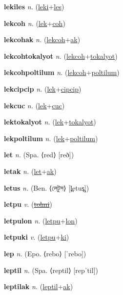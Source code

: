 \textbf{\hypertarget{lekiles}{lekiles}} \textit{n.} (\hyperlink{leki}{leki}+\allowbreak \hyperlink{les}{les})


\textbf{\hypertarget{lekcoh}{lekcoh}} \textit{n.} (\hyperlink{lek}{lek}+\allowbreak \hyperlink{coh}{coh})


\textbf{\hypertarget{lekcohak}{lekcohak}} \textit{n.} (\hyperlink{lekcoh}{lekcoh}+\allowbreak \hyperlink{ak}{ak})


\textbf{\hypertarget{lekcohtokalyot}{lekcohtokalyot}} \textit{n.} (\hyperlink{lekcoh}{lekcoh}+\allowbreak \hyperlink{tokalyot}{tokalyot})


\textbf{\hypertarget{lekcohpoltilum}{lekcohpoltilum}} \textit{n.} (\hyperlink{lekcoh}{lekcoh}+\allowbreak \hyperlink{poltilum}{poltilum})


\textbf{\hypertarget{lekcipcip}{lekcipcip}} \textit{n.} (\hyperlink{lek}{lek}+\allowbreak \hyperlink{cipcip}{cipcip})


\textbf{\hypertarget{lekcuc}{lekcuc}} \textit{n.} (\hyperlink{lek}{lek}+\allowbreak \hyperlink{cuc}{cuc})


\textbf{\hypertarget{lektokalyot}{lektokalyot}} \textit{n.} (\hyperlink{lek}{lek}+\allowbreak \hyperlink{tokalyot}{tokalyot})


\textbf{\hypertarget{lekpoltilum}{lekpoltilum}} \textit{n.} (\hyperlink{lek}{lek}+\allowbreak \hyperlink{poltilum}{poltilum})


\textbf{\hypertarget{let}{let}} \textit{n.} (Spa. ⟨red⟩ [reð])


\textbf{\hypertarget{letak}{letak}} \textit{n.} (\hyperlink{let}{let}+\allowbreak \hyperlink{ak}{ak})


\textbf{\hypertarget{letus}{letus}} \textit{n.} (Ben. ⟨{\bengali{}লেটুস}⟩ [l̪etus̪])


\textbf{\hypertarget{letpu}{letpu}} \textit{v.} (\hyperlink{tolmi}{\sout{tolmi}})


\textbf{\hypertarget{letpulon}{letpulon}} \textit{n.} (\hyperlink{letpu}{letpu}+\allowbreak \hyperlink{lon}{lon})


\textbf{\hypertarget{letpuki}{letpuki}} \textit{v.} (\hyperlink{letpu}{letpu}+\allowbreak \hyperlink{ki}{ki})


\textbf{\hypertarget{lep}{lep}} \textit{n.} (Epo. ⟨rebo⟩ [ˈrebo])


\textbf{\hypertarget{leptil}{leptil}} \textit{n.} (Spa. ⟨reptil⟩ [repˈtil])


\textbf{\hypertarget{leptilak}{leptilak}} \textit{n.} (\hyperlink{leptil}{leptil}+\allowbreak \hyperlink{ak}{ak})


